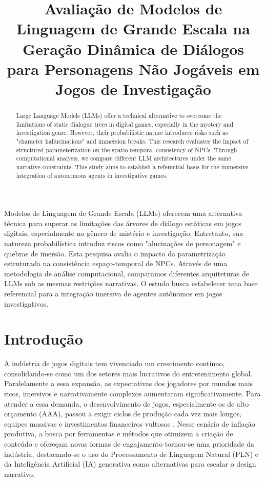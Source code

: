 \documentclass[12pt]{article}
\title{Avaliação de Modelos de Linguagem de Grande Escala na Geração Dinâmica de Diálogos para Personagens Não Jogáveis em Jogos de Investigação}
\begin{document}
 


\begin{abstract}
Large Language Models (LLMs) offer a technical alternative to overcome the limitations of static dialogue trees in digital games, especially in the mystery and investigation genre. However, their probabilistic nature introduces risks such as "character hallucinations" and immersion breaks. This research evaluates the impact of structured parameterization on the spatio-temporal consistency of NPCs. Through computational analysis, we compare different LLM architectures under the same narrative constraints. This study aims to establish a referential basis for the immersive integration of autonomous agents in investigative games.
\end{abstract}

\begin{resumo}
Modelos de Linguagem de Grande Escala (LLMs) oferecem uma alternativa técnica para superar as limitações das árvores de diálogo estáticas em jogos digitais, especialmente no gênero de mistério e investigação. Entretanto, sua natureza probabilística introduz riscos como "alucinações de personagem" e quebras de imersão. Esta pesquisa avalia o impacto da parametrização estruturada na consistência espaço-temporal de NPCs. Através de uma metodologia de análise computacional, comparamos diferentes arquiteturas de LLMs sob as mesmas restrições narrativas. O estudo busca estabelecer uma base referencial para a integração imersiva de agentes autônomos em jogos investigativos.
\end{resumo}

\section{Introdução}

A indústria de jogos digitais tem vivenciado um crescimento contínuo, consolidando-se como um dos setores mais lucrativos do entretenimento global. Paralelamente a essa expansão, as expectativas dos jogadores por mundos mais ricos, imersivos e narrativamente complexos aumentaram significativamente. Para atender a essa demanda, o desenvolvimento de jogos, especialmente os de alto orçamento (AAA), passou a exigir ciclos de produção cada vez mais longos, equipes massivas e investimentos financeiros vultosos \cite{inserir_ref_custos_jogos}. Nesse cenário de inflação produtiva, a busca por ferramentas e métodos que otimizem a criação de conteúdo e ofereçam novas formas de engajamento tornou-se uma prioridade da indústria, destacando-se o uso do Processamento de Linguagem Natural (PLN) e da Inteligência Artificial (IA) generativa como alternativas para escalar o design narrativo.
\end{document}
